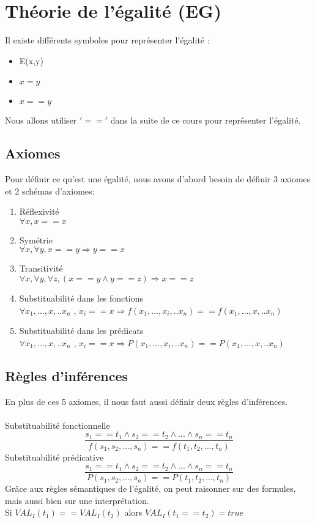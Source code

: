 \section{Théorie de l'égalité (EG)}
Il existe différents symboles pour représenter l'égalité : 
\begin{itemize}
	\item E(x,y)
	\item $x = y$
	\item $x == y $
\end{itemize}
Nous allons utiliser $'=='$ dans la suite de ce cours pour représenter l'égalité.

\subsection{Axiomes} 
Pour définir ce qu'est une égalité, nous avons d'abord besoin de définir 3 axiomes et 2 schémas d'axiomes:
\begin{enumerate}
\item Réflexivité \\$\forall x, x==x$
\item Symétrie \\$\forall x, \forall y, x==y \Rightarrow y==x$
\item Transitivité \\$\forall x, \forall y, \forall z, (x==y \land y==z) \Rightarrow x==z$
\item Substituabilité dans les fonctions\\$\forall x_{1}, ...,x, .. x_{n}$ ,  $x_{i}==x \Rightarrow f(x_{1}, ...,x_{i}, .. x_{n}) == f(x_{1}, ...,x, .. x_{n})$
\item Substituabilité dans les prédicats\\$\forall x_{1}, ...,x, .. x_{n}$ ,  $x_{i}==x \Rightarrow P(x_{1}, ...,x_{i}, .. x_{n}) == P(x_{1}, ...,x, .. x_{n})$ 
\end{enumerate}
\subsection{Règles d'inférences}
En plus de ces 5 axiomes, il nous faut aussi définir deux règles d'inférences.\\ \\
Substituabilité fonctionnelle 
	$$ \frac{s_{1}==t_{1} \land s_{2}==t_{2} \land ... \land s_{n}==t_{n}}{f(s_{1},s_{2},...,s_{n}) == f(t_{1},t_{2},...,t_{n})}$$ 
	Substituabilité prédicative 
	$$ \frac{s_{1}==t_{1} \land s_{2}==t_{2} \land ... \land s_{n}==t_{n}}{P(s_{1},s_{2},...,s_{n}) == P(t_{1},t_{2},...,t_{n})}$$ 
Grâce aux règles sémantiques de l'égalité, on peut raisonner sur des formules, mais aussi bien sur une interprétation. \\ 
Si $VAL_{I}(t_{1}) ==  VAL_{I}(t_{2})$ alors $VAL_{I}(t_{1} == t_{2}) = true$
